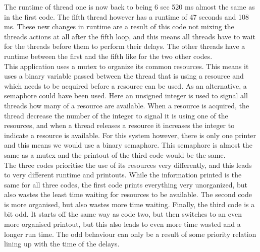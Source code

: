 \documentclass[12pt, A4paper, english]{book}
\begin{document}
The runtime of thread one is now back to being 6 sec 520 ms almost the same as in the first code. The fifth thread however has a runtime of 47 seconds and 108 ms. These new changes in runtime are a result of this code not mixing the threads actions at all after the fifth loop, and this means all threads have to wait for the threads before them to perform their delays. The other threads have a runtime between the first and the fifth like for the two other codes. \\
This application uses a mutex \cite{task} to organize its common resources. This means it uses a binary variable passed between the thread that is using a resource and which needs to be acquired before a resource can be used. As an alternative, a semaphore could have been used. Here an unsigned integer is used to signal all threads how many of a resource are available. When a resource is acquired, the thread decrease the number of the integer to signal it is using one of the resources, and when a thread releases a resource it increases the integer to indicate a resource is available. For this system however, there is only one printer and this means we would use a binary semaphore. This semaphore is almost the same as a mutex and the printout of the third code would be the same. \\
The three codes prioritise the use of its resources very differently, and this leads to very different runtime and printouts. While the information printed is the same for all three codes, the first code prints everything very unorganized, but also wastes the least time waiting for resources to be available. The second code is more organised, but also wastes more time waiting. Finally, the third code is a bit odd. It starts off the same way as code two, but then switches to an even more organised printout, but this also leads to even more time wasted and a longer run time. The odd behaviour can only be a result of some priority relation lining up with the time of the delays.
\end{document}
